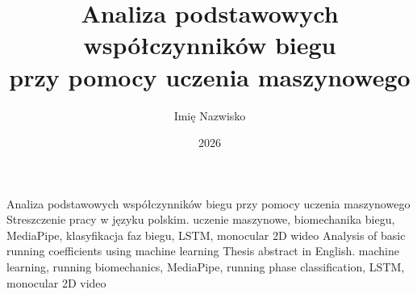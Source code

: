 \documentclass{SGGW-thesis}
\title{Analiza podstawowych współczynników biegu\\przy pomocy uczenia maszynowego}
\author{Imię Nazwisko}                     %
\date{2026}                                %
\begin{document}
\maketitle
\statementpage


\abstractpage
{Analiza podstawowych współczynników biegu przy pomocy uczenia maszynowego}
{
Streszczenie pracy w języku polskim.
}
{uczenie maszynowe, biomechanika biegu, MediaPipe, klasyfikacja faz biegu, LSTM, monocular 2D wideo}
{Analysis of basic running coefficients using machine learning}
{
Thesis abstract in English.
}
{machine learning, running biomechanics, MediaPipe, running phase classification, LSTM, monocular 2D video}


{
  \doublespacing
  \tableofcontents
}

\startchapterfromoddpage














\beforelastpage
\end{document}
